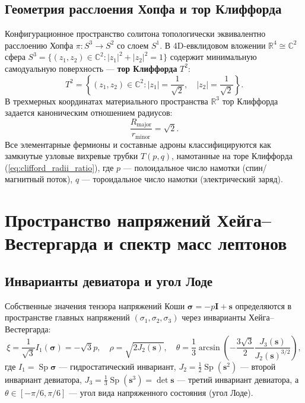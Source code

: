 \documentclass[12pt,a4paper]{article}
\theoremstyle{definition}
\theoremstyle{remark}
\begin{document}
\subsection{Геометрия расслоения Хопфа и тор Клиффорда}
Конфигурационное пространство солитона топологически эквивалентно расслоению Хопфа $\pi: S^3 \to S^2$ со слоем $S^1$. В 4D-евклидовом вложении $\mathbb{R}^4 \cong \mathbb{C}^2$ сфера $S^3 = \{ (z_1, z_2) \in \mathbb{C}^2 : |z_1|^2 + |z_2|^2 = 1 \}$ содержит минимальную самодуальную поверхность --- \textbf{тор Клиффорда} $T^2$:
\begin{equation}
	T^2 = \left\{ (z_1, z_2) \in \mathbb{C}^2 : |z_1| = \frac{1}{\sqrt{2}}, \quad |z_2| = \frac{1}{\sqrt{2}} \right\}.
	\label{eq:clifford_torus}
\end{equation}
В трехмерных координатах материального пространства $\mathbb{R}^3$ тор Клиффорда задается каноническим отношением радиусов:
\begin{equation}
	\frac{R_{\mathrm{major}}}{r_{\mathrm{minor}}} = \sqrt{2}.
	\label{eq:clifford_radii_ratio}
\end{equation}
Все элементарные фермионы и составные адроны классифицируются как замкнутые узловые вихревые трубки $T(p,q)$, намотанные на торе Клиффорда (\ref{eq:clifford_radii_ratio}), где $p$ --- полоидальное число намотки (спин/магнитный поток), $q$ --- тороидальное число намотки (электрический заряд).


\section{Пространство напряжений Хейга--Вестергарда и спектр масс лептонов}
\label{sec:leptons}

\subsection{Инварианты девиатора и угол Лоде}
Собственные значения тензора напряжений Коши $\boldsymbol{\sigma} = -p\mathbf{I} + \mathbf{s}$ определяются в пространстве главных напряжений $(\sigma_1, \sigma_2, \sigma_3)$ через инварианты Хейга--Вестергарда:
\begin{equation}
	\xi = \frac{1}{\sqrt{3}} I_1(\boldsymbol{\sigma}) = -\sqrt{3} p, \quad \rho = \sqrt{2 J_2(\mathbf{s})}, \quad \theta = \frac{1}{3} \arcsin\left( -\frac{3\sqrt{3}}{2} \frac{J_3(\mathbf{s})}{J_2(\mathbf{s})^{3/2}} \right),
	\label{eq:haigh_westergaard}
\end{equation}
где $I_1 = \operatorname{Sp}\boldsymbol{\sigma}$ --- гидростатический инвариант, $J_2 = \frac{1}{2}\operatorname{Sp}(\mathbf{s}^2)$ --- второй инвариант девиатора, $J_3 = \frac{1}{3}\operatorname{Sp}(\mathbf{s}^3) = \det \mathbf{s}$ --- третий инвариант девиатора, а $\theta \in [-\pi/6, \pi/6]$ --- угол вида напряженного состояния (угол Лоде).
\end{document}
